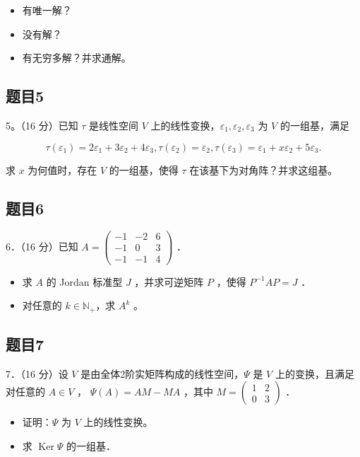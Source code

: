 \documentclass{article}
\begin{document}
\begin{itemize}
  \item[（1）] 有唯一解？
  \item[（2）] 没有解？
  \item[（3）] 有无穷多解？并求通解。
\end{itemize}

\subsection{题目5}
5。（16 分）已知 \(\tau\) 是线性空间 \(V\) 上的线性变换，\(\varepsilon_{1}, \varepsilon_{2}, \varepsilon_{3}\) 为 \(V\) 的一组基，满足

\[
\tau\left(\varepsilon_{1}\right)=2 \varepsilon_{1}+3 \varepsilon_{2}+4 \varepsilon_{3}, \tau\left(\varepsilon_{2}\right)=\varepsilon_{2}, \tau\left(\varepsilon_{3}\right)=\varepsilon_{1}+x \varepsilon_{2}+5 \varepsilon_{3} .
\]

求 \(x\) 为何值时，存在 \(V\) 的一组基，使得 \(\tau\) 在该基下为对角阵？并求这组基。

\subsection{题目6}
6．（16 分）已知 \(A=\left(\begin{array}{ccc}-1 & -2 & 6 \\ -1 & 0 & 3 \\ -1 & -1 & 4\end{array}\right)\) ．

\begin{itemize}
  \item[（1）] 求 \(A\) 的 Jordan 标准型 \(J\) ，并求可逆矩阵 \(P\) ，使得 \(P^{-1} A P=J\) ．
  \item[（2）] 对任意的 \(k \in \mathbb{N}_{+}\)，求 \(A^{k}\) 。
\end{itemize}

\subsection{题目7}
7．（16 分）设 \(V\) 是由全体2阶实矩阵构成的线性空间，\(\Psi\) 是 \(V\) 上的变换，且满足对任意的 \(A \in V\) ， \(\Psi(A)=A M-M A\) ，其中 \(M=\left(\begin{array}{ll}1 & 2 \\ 0 & 3\end{array}\right)\) ．

\begin{itemize}
  \item[（1）] 证明：\(\Psi\) 为 \(V\) 上的线性变换。
  \item[（2）] 求 \(\operatorname{Ker} \Psi\) 的一组基．
\end{itemize}
\end{document}
